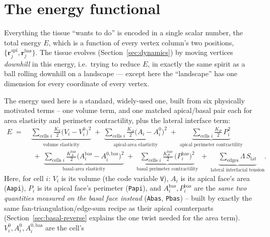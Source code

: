 \documentclass[11pt,a4paper]{report}
\newcommand{\rvec}{\mathbf{r}}
\begin{document}
\section{The energy functional}
\label{sec:energy}

Everything the tissue ``wants to do'' is encoded in a single scalar
number, the total energy $E$, which is a function of every vertex
column's two positions, $\{\rvec^{\mathrm{api}}_j, \rvec^{\mathrm{bas}}_j\}$.
The tissue evolves (Section~\ref{sec:dynamics}) by moving vertices
\emph{downhill} in this energy, i.e.\ trying to reduce $E$, in exactly
the same spirit as a ball rolling downhill on a landscape --- except
here the ``landscape'' has one dimension for every coordinate of every
vertex.

The energy used here is a standard, widely-used one, built from six
physically motivated terms -- one volume term, and one matched
apical/basal pair each for area elasticity and perimeter
contractility, plus the lateral interface term:
\begin{equation}
\begin{aligned}
  E \;=\;&
  \underbrace{\sum_{\text{cells } i} \frac{K_V}{2}\bigl(V_i - V_i^0\bigr)^2}_{\text{volume elasticity}}
  \;+\;
  \underbrace{\sum_{\text{cells } i} \frac{K_A}{2}\bigl(A_i - A_i^0\bigr)^2}_{\text{apical-area elasticity}}
  \;+\;
  \underbrace{\sum_{\text{cells } i} \frac{K_P}{2}\, P_i^2}_{\text{apical perimeter contractility}}
  \\[4pt]
  &\;+\;
  \underbrace{\sum_{\text{cells } i} \frac{K_A^{\mathrm{bas}}}{2}\bigl(A_i^{\mathrm{bas}} - A_i^{0,\mathrm{bas}}\bigr)^2}_{\text{basal-area elasticity}}
  \;+\;
  \underbrace{\sum_{\text{cells } i} \frac{K_P^{\mathrm{bas}}}{2}\, \bigl(P_i^{\mathrm{bas}}\bigr)^2}_{\text{basal perimeter contractility}}
  \;+\;
  \underbrace{\sum_{\text{edges}} \Lambda \, S_{\mathrm{lat}}}_{\text{lateral interfacial tension}} .
\end{aligned}
  \label{eq:energy}
\end{equation}
Here, for cell $i$: $V_i$ is its volume (the code variable \texttt{V}),
$A_i$ is its apical face's area (\texttt{Aapi}), $P_i$ is its apical
face's perimeter (\texttt{Papi}), and $A_i^{\mathrm{bas}}, P_i^{\mathrm{bas}}$
are the \emph{same two quantities measured on the basal face instead}
(\texttt{Abas}, \texttt{Pbas}) -- built by exactly the same
fan-triangulation/edge-sum recipe as their apical counterparts
(Section~\ref{sec:basal-reverse} explains the one twist needed for the
area term). $V_i^0, A_i^0, A_i^{0,\mathrm{bas}}$ are the cell's
\end{document}
